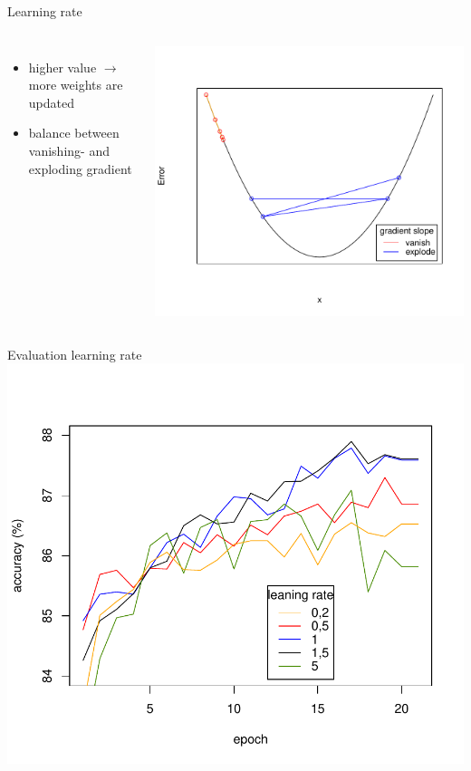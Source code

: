 \documentclass[aspectratio=1610, 12pt]{beamer}
\begin{document}
\begin{frame}{Learning rate}
	\begin{columns}
		\begin{itemize}
			\item higher value $\rightarrow$ more weights are updated
			\item balance between vanishing- and exploding gradient
		\end{itemize}
		\centering
		\vspace*{-1cm}\includegraphics[scale=0.5]{images/gradient_graph.pdf}



	\end{columns}

\end{frame}
\begin{frame}{Evaluation learning rate}
	\centering
	\vspace*{-1cm}\includegraphics[scale=0.6]{images/learningrate_measurement.pdf}
\end{frame}
\end{document}
